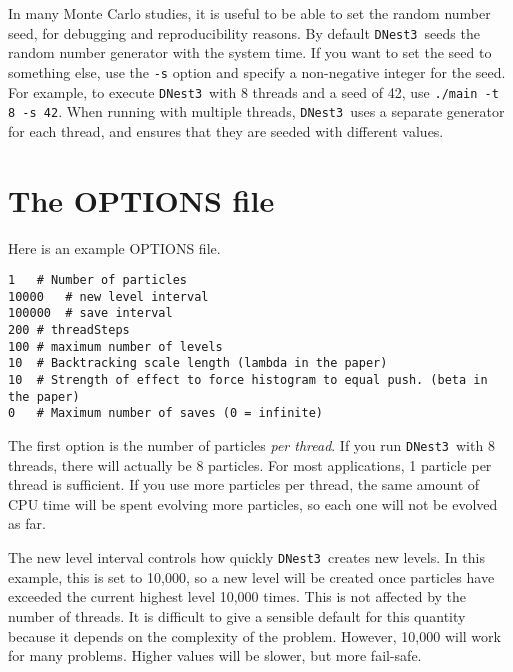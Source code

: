 \documentclass[a4paper, 11pt]{article}
\newcommand{\dnest}{{\tt DNest3}}
\begin{document}
In many Monte Carlo studies, it is useful to be able to set the random number
seed, for debugging and reproducibility reasons. By default \dnest~seeds the
random number generator with the system time. If you want to set the seed to
something else, use the {\tt -s} option and specify a non-negative integer for
the seed. For example, to execute \dnest~with
8 threads and a seed of 42, use {\tt ./main -t 8 -s 42}.
When running with multiple threads, \dnest~uses a separate generator for each
thread, and ensures that they are seeded with different values.

\section{The OPTIONS file}
Here is an example OPTIONS file.
\begin{verbatim}
1	# Number of particles
10000	# new level interval
100000	# save interval
200	# threadSteps
100	# maximum number of levels
10	# Backtracking scale length (lambda in the paper)
10	# Strength of effect to force histogram to equal push. (beta in the paper)
0	# Maximum number of saves (0 = infinite)
\end{verbatim}
The first option is the number of particles {\it per thread}. If you run
\dnest~with 8 threads, there will actually be 8 particles. For most
applications, 1 particle per thread is sufficient. If you use more particles
per thread, the same amount of CPU time will be spent evolving more particles,
so each one will not be evolved as far.

The new level interval controls how quickly \dnest~creates new levels. In this
example, this is set to 10,000, so a new level will be created once particles
have exceeded the current highest level 10,000 times. This is not affected by
the number of threads. It is difficult to give a sensible default for this
quantity because it depends on the complexity of the problem. However, 10,000
will work for many problems. Higher values will be slower, but more fail-safe.
\end{document}
